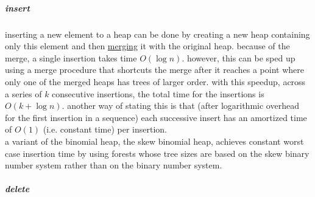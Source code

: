 \documentclass[a4paper,12pt]{article}
\begin{document}
\subparagraph{insert}
\label{sec:org27eb891}
inserting a new element to a heap can be done by creating a new heap containing only this element and then \hyperref[sec:org6a4cc43]{merging} it with the original heap. because of the merge, a single insertion takes time \(O(\log n)\). however, this can be sped up using a merge procedure that shortcuts the merge after it reaches a point where only one of the merged heaps has trees of larger order. with this speedup, across a series of \(k\) consecutive insertions, the total time for the insertions is \(O(k+\log n)\). another way of stating this is that (after logarithmic overhead for the first insertion in a sequence) each successive insert has an amortized time of \(O(1)\) (i.e. constant time) per insertion.\\[0pt]
a variant of the binomial heap, the skew binomial heap, achieves constant worst case insertion time by using forests whose tree sizes are based on the skew binary number system rather than on the binary number system.\\[0pt]
\subparagraph{delete}
\label{sec:orge4c8c42}
\end{document}
